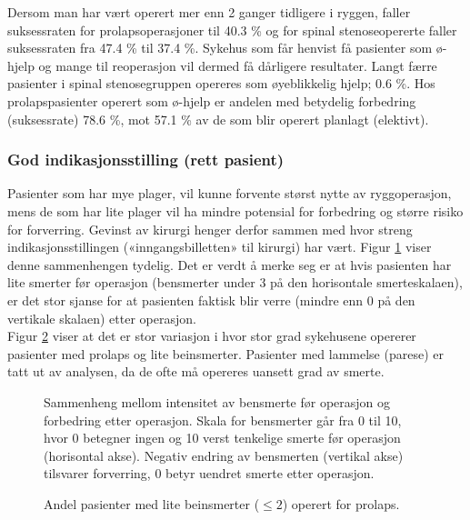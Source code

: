 \documentclass [norsk,a4paper,twoside]{article}\usepackage[]{graphicx}\usepackage[]{color}
\begin{document}
Dersom man har vært operert mer enn 2 ganger tidligere i
ryggen, faller suksessraten for prolapsoperasjoner til 40.3 \% 
og for spinal stenoseopererte faller suksessraten fra 
47.4 \% til 37.4 \%. 
Sykehus som får henvist få pasienter som ø-hjelp og
mange til reoperasjon vil dermed få dårligere resultater. 
Langt færre pasienter i spinal stenosegruppen opereres som øyeblikkelig hjelp; 0.6 \%.
Hos prolapspasienter operert som ø-hjelp er andelen med betydelig forbedring 
(suksessrate)  78.6 \%, mot 57.1 \% av de som blir 
operert planlagt (elektivt). 




\subsubsection{God indikasjonsstilling (rett pasient)}



Pasienter som har mye plager, vil kunne forvente størst nytte av ryggoperasjon,
mens de som har lite plager vil ha mindre potensial for forbedring og større risiko
for forverring. Gevinst av kirurgi henger derfor sammen med hvor streng
indikasjonsstillingen («inngangsbilletten» til kirurgi) har vært. Figur \ref{fig:BeinsmEndrPre} viser denne
sammenhengen tydelig. Det er verdt å merke seg er at hvis pasienten har lite smerter før
operasjon (bensmerter under 3 på den horisontale smerteskalaen), er det stor
sjanse for at pasienten faktisk blir verre (mindre enn 0 på den vertikale skalaen) etter
operasjon. \\
Figur \ref{fig:BeinsmLavPre} viser at det er stor variasjon i hvor stor grad sykehusene opererer
pasienter med prolaps og lite beinsmerter. Pasienter med lammelse (parese) er tatt
ut av analysen, da de ofte må opereres uansett grad av smerte.



\begin{figure}[ht]
\caption{\label{fig:BeinsmEndrPre}  Sammenheng mellom intensitet av bensmerte før operasjon og
forbedring etter operasjon. Skala for bensmerter går fra 0 til 10, hvor 0 betegner
ingen og 10 verst tenkelige smerte før operasjon (horisontal akse). Negativ endring
av bensmerten (vertikal akse) tilsvarer forverring, 0 betyr uendret smerte etter
operasjon.}
\end{figure}

\begin{figure}[ht]
\caption{\label{fig:BeinsmLavPre}  Andel pasienter med lite beinsmerter ($\leq 2$) operert for prolaps.}
\end{figure}
\end{document}
